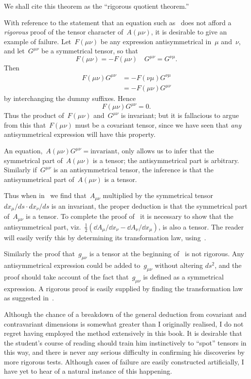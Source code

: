 \documentclass[12pt]{book}
\begin{document}
We shall cite this theorem as the ``rigorous quotient theorem.''

With reference to the statement that an equation such as~ does not afford a \emph{rigorous} proof of
the tensor character of~$A(\mu\nu)$, it is desirable to give an example of failure.
Let~$F(\mu\nu)$ be any expression antisymmetrical in~$\mu$ and~$\nu$, and let~$G^{\mu\nu}$ be a symmetrical tensor,
so that
\[
F(\mu\nu) = -F(\mu\nu) \quad G^{\mu\nu} = G^{\nu\mu}.
\]
Then
\begin{align*}
F(\mu\nu)G^{\mu\nu} & = - F(\nu\mu)G^{\nu\mu}\\
                    & = - F(\mu\nu)G^{\mu\nu}
\end{align*}
by interchanging the dummy suffixes. Hence
\[
F(\mu\nu)G^{\mu\nu} = 0.
\]
Thus the product of~$F(\mu\nu)$ and~$G^{\mu\nu}$ is invariant; but it is fallacious to argue from this
that~$F(\mu\nu)$ must be a covariant tensor, since we have seen that \emph{any} antisymmetrical expression will have
this property.

An equation,~$A(\mu\nu)G^{\mu\nu} = \text{invariant}$, only allows us to infer that the
symmetrical part of~$A(\mu\nu)$ is a tensor; the antisymmetrical part is arbitrary.
Similarly if~$G^{\mu\nu}$ is an antisymmetrical tensor, the inference is that the antisymmetrical part
of~$A(\mu\nu)$ is a tensor.

Thus when in~ we find that~$A_{\mu\nu}$ multiplied by the symmetrical tensor~$dx_\mu/ds \cdot dx_\nu/ds$
is an invariant, the proper deduction is that the symmetrical part of~$A_{\mu\nu}$ is a tensor.
To complete the proof of~ it is necessary to show that the antisymmetrical part,
viz.~$\frac{1}{2}(\dd A_\mu/{\dd x_\nu} - \dd A_\nu/{\dd x_\mu})$, is also a tensor.
The reader will easily verify this by determining its transformation law, using~.

Similarly the proof that~$g_{\mu\nu}$ is a tensor at the beginning of~ is not rigorous.
Any antisymmetrical expression could be added to~$g_{\mu\nu}$ without altering $ds^2$, and the proof should take
account of the fact that~$g_{\mu\nu}$ is defined as a symmetrical expression.
A rigorous proof is easily supplied by finding the transformation law as suggested in~.

Although the chance of a breakdown of the general deduction from covariant and contravariant dimensions is somewhat
greater than I originally realised, I do not regret having employed the method extensively in this book.
It is desirable that the student's course of reading should train him instinctively to ``spot'' tensors in this way,
and there is never any serious difficulty in confirming his discoveries by more rigorous tests.
Although cases of failure are easily constructed artificially, I have yet to hear of a natural instance of this
happening.
\end{document}
